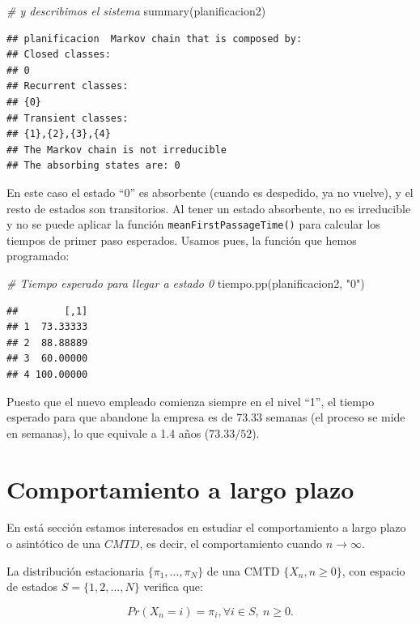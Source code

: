 \documentclass[
]{book}
\newenvironment{Shaded}{\begin{snugshade}}{\end{snugshade}}
\newcommand{\CommentTok}[1]{\textcolor[rgb]{0.56,0.35,0.01}{\textit{#1}}}
\newcommand{\FunctionTok}[1]{\textcolor[rgb]{0.00,0.00,0.00}{#1}}
\newcommand{\NormalTok}[1]{#1}
\newcommand{\StringTok}[1]{\textcolor[rgb]{0.31,0.60,0.02}{#1}}
\newenvironment{yellowbox}{
  \definecolor{shadecolor}{rgb}{210, 180, 140}  
  \color{black}
  \begin{shaded}}
 {\end{shaded}}
\theoremstyle{definition}
\theoremstyle{definition}
\theoremstyle{definition}
\theoremstyle{definition}
\theoremstyle{remark}
\begin{document}
\begin{Shaded}
\begin{Highlighting}[]
\CommentTok{\# y describimos el sistema}
\FunctionTok{summary}\NormalTok{(planificacion2)}
\end{Highlighting}
\end{Shaded}

\begin{verbatim}
## planificacion  Markov chain that is composed by: 
## Closed classes: 
## 0 
## Recurrent classes: 
## {0}
## Transient classes: 
## {1},{2},{3},{4}
## The Markov chain is not irreducible 
## The absorbing states are: 0
\end{verbatim}

En este caso el estado ``0'' es absorbente (cuando es despedido, ya no vuelve), y el resto de estados son transitorios. Al tener un estado absorbente, no es irreducible y no se puede aplicar la función \texttt{meanFirstPassageTime()} para calcular los tiempos de primer paso esperados. Usamos pues, la función que hemos programado:

\begin{Shaded}
\begin{Highlighting}[]
\CommentTok{\# Tiempo esperado para llegar a estado 0}
\FunctionTok{tiempo.pp}\NormalTok{(planificacion2, }\StringTok{"0"}\NormalTok{)}
\end{Highlighting}
\end{Shaded}

\begin{verbatim}
##        [,1]
## 1  73.33333
## 2  88.88889
## 3  60.00000
## 4 100.00000
\end{verbatim}

Puesto que el nuevo empleado comienza siempre en el nivel ``1'', el tiempo esperado para que abandone la empresa es de 73.33 semanas (el proceso se mide en semanas), lo que equivale a 1.4 años (\(73.33/52\)).

\hypertarget{AsinCMTD}{%
\section{Comportamiento a largo plazo}\label{AsinCMTD}}

En está sección estamos interesados en estudiar el comportamiento a largo plazo o asintótico de una \(CMTD\), es decir, el comportamiento cuando \(n \rightarrow \infty\).

\begin{yellowbox}

La distribución estacionaria \(\{\pi_1,..., \pi_N\}\) de una CMTD \(\{X_n, n \geq 0\}\), con espacio de estados \(S =\{1, 2,..., N\}\) verifica que:

\[Pr(X_n=i)=\pi_i, \forall i \in S, \ n \geq 0.\]

\end{yellowbox}
\end{document}
